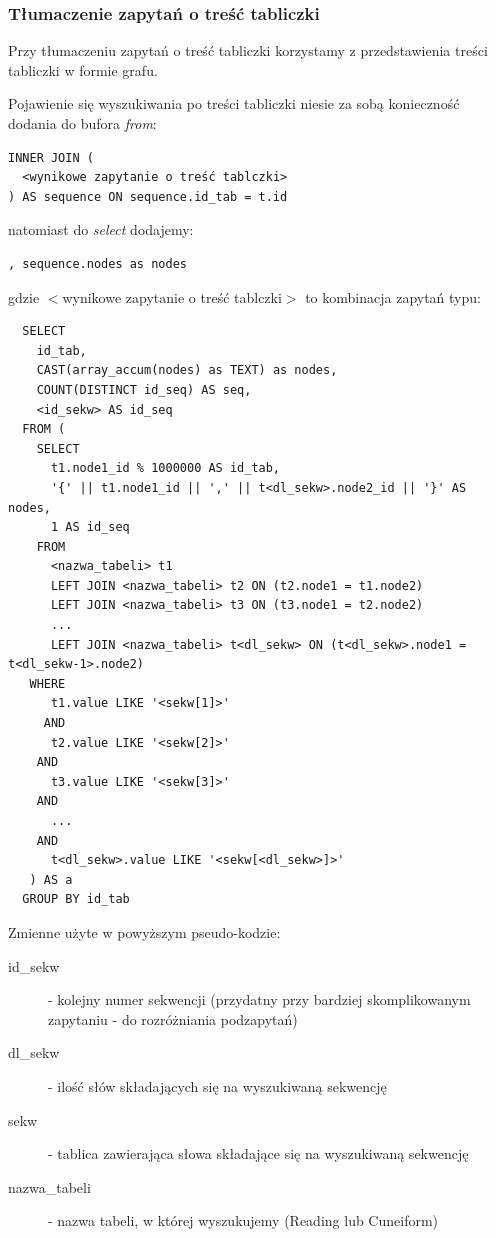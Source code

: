 \subsubsection{Tłumaczenie zapytań o treść tabliczki}
Przy tłumaczeniu zapytań o treść tabliczki
korzystamy z przedstawienia treści tabliczki w formie grafu.

Pojawienie się wyszukiwania po treści tabliczki niesie za sobą konieczność dodania do bufora \textit{from}:
\begin{verbatim}
INNER JOIN (
  <wynikowe zapytanie o treść tablczki>
) AS sequence ON sequence.id_tab = t.id
\end{verbatim}

natomiast do \textit{select} dodajemy:
\begin{verbatim}
, sequence.nodes as nodes
\end{verbatim}

gdzie $<$wynikowe zapytanie o treść tablczki$>$ to kombinacja zapytań typu:
\begin{verbatim}
  SELECT 
    id_tab, 
    CAST(array_accum(nodes) as TEXT) as nodes, 
    COUNT(DISTINCT id_seq) AS seq, 
    <id_sekw> AS id_seq
  FROM (
    SELECT
      t1.node1_id % 1000000 AS id_tab,
      '{' || t1.node1_id || ',' || t<dl_sekw>.node2_id || '}' AS nodes,
      1 AS id_seq
    FROM
      <nazwa_tabeli> t1
      LEFT JOIN <nazwa_tabeli> t2 ON (t2.node1 = t1.node2)
      LEFT JOIN <nazwa_tabeli> t3 ON (t3.node1 = t2.node2)
      ...
      LEFT JOIN <nazwa_tabeli> t<dl_sekw> ON (t<dl_sekw>.node1 = t<dl_sekw-1>.node2)
   WHERE
      t1.value LIKE '<sekw[1]>'
     AND
      t2.value LIKE '<sekw[2]>'
    AND
      t3.value LIKE '<sekw[3]>'
    AND
      ...
    AND
      t<dl_sekw>.value LIKE '<sekw[<dl_sekw>]>'
   ) AS a 
  GROUP BY id_tab
\end{verbatim}
Zmienne użyte w powyższym pseudo-kodzie:
\begin{description}
 \item[id\_sekw] - kolejny numer sekwencji (przydatny przy bardziej skomplikowanym zapytaniu - do rozróżniania podzapytań)
 \item[dl\_sekw] - ilość słów składających się na wyszukiwaną sekwencję
 \item[sekw] - tablica zawierająca słowa składające się na wyszukiwaną sekwencję
\item[nazwa\_tabeli] - nazwa tabeli, w której wyszukujemy (Reading lub Cuneiform)
 \end{description}

